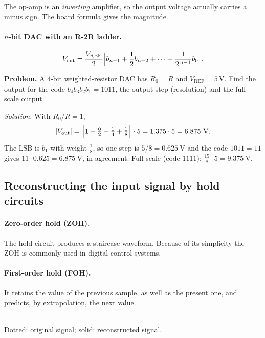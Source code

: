 \begin{center}
\resizebox{\linewidth}{!}{}
\end{center}

\begin{boardnote}
The op-amp is an \emph{inverting} amplifier, so the output voltage actually carries a minus sign. The board
formula gives the magnitude.
\end{boardnote}

\paragraph{$n$-bit DAC with an R-2R ladder.}
\begin{equation}
  V_{\mathrm{out}}=\frac{V_{\mathrm{REF}}}{2}\Bigl[b_{n-1}+\frac{1}{2}b_{n-2}+\cdots+\frac{1}{2^{\,n-1}}b_{0}\Bigr].
\end{equation}

\begin{center}
\resizebox{\linewidth}{!}{}
\end{center}

\begin{addsol}
\textbf{Problem.} A 4-bit weighted-resistor DAC has $R_0=R$ and $V_{\mathrm{REF}}=5\,\mathrm{V}$. Find the
output for the code $b_4b_3b_2b_1=1011$, the output step (resolution) and the full-scale output.

\medskip\noindent
\emph{Solution.} With $R_0/R=1$,
\[
  \lvert V_{\mathrm{out}}\rvert=\Bigl[1+\tfrac{0}{2}+\tfrac14+\tfrac18\Bigr]\cdot 5=1.375\cdot5=6.875\ \mathrm{V}.
\]
The LSB is $b_1$ with weight $\tfrac18$, so one step is $5/8=0.625\ \mathrm{V}$ and the code $1011=11$ gives
$11\cdot0.625=6.875\ \mathrm{V}$, in agreement. Full scale (code $1111$): $\tfrac{15}{8}\cdot5=9.375\ \mathrm{V}$.
\end{addsol}

\subsection{Reconstructing the input signal by hold circuits}
\paragraph{Zero-order hold (ZOH).} The hold circuit produces a staircase waveform. Because of its simplicity
the ZOH is commonly used in digital control systems.

\paragraph{First-order hold (FOH).} It retains the value of the previous sample, as well as the present one,
and predicts, by extrapolation, the next value.

\begin{center}
\\[2pt]
{\small Dotted: original signal; solid: reconstructed signal.}
\end{center}


